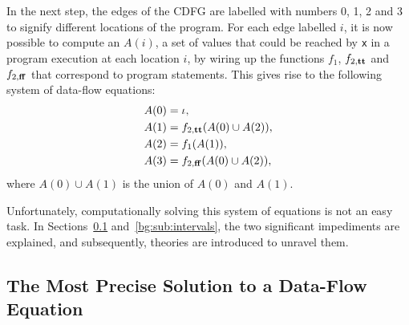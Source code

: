 In the next step, the edges of the CDFG are labelled with numbers 0, 1, 2
and 3 to signify different locations of the program.  For each edge labelled
$i$, it is now possible to compute an $A(i)$, a set of values that could be
reached by \verb|x| in a program execution at each location $i$, by wiring up
the functions $f_1$, $f_{2, \mathbf{tt}}$ and $f_{2, \mathbf{ff}}$ that correspond
to program statements.  This gives rise to the following system of data-flow
equations:
\begin{align}
    A(0) &= \iota,
        \label{bg:eq:dfa0} \\
    A(1) &= f_{2, \mathbf{tt}}(A(0) \cup A(2)),
        \label{bg:eq:dfa1} \\
    A(2) &= f_1(A(1)),
        \label{bg:eq:dfa2} \\
    A(3) &= f_{2, \mathbf{ff}}(A(0) \cup A(2)),
        \label{bg:eq:dfa3}
\end{align}
where $A(0) \cup A(1)$ is the union of $A(0)$ and $A(1)$.

Unfortunately, computationally solving this system of equations is not an
easy task.  In Sections~\ref{bg:sub:most_precise} and~\ref{bg:sub:intervals},
the two significant impediments are explained, and subsequently, theories are
introduced to unravel them.


\subsection{The Most Precise Solution to a Data-Flow Equation}
\label{bg:sub:most_precise}

